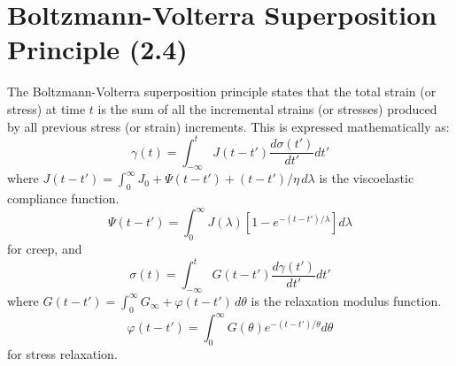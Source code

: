\section{Boltzmann-Volterra Superposition Principle (2.4)}
The Boltzmann-Volterra superposition principle states that the total strain (or stress) at time $t$ is the sum of all the incremental strains (or stresses) produced by all previous stress (or strain) increments.
This is expressed mathematically as:
\begin{equation}
	\gamma(t) = \int_{-\infty}^t J(t - t') \frac{d\sigma(t')}{dt'} dt'
\end{equation}
where $J(t - t') = \int_0^\infty J_0 + \Psi(t - t') + (t - t')/\eta \, d\lambda$ is the viscoelastic compliance function.
\begin{equation}
	\Psi(t - t') = \int_0^\infty J(\lambda) \left[1 - e^{-(t - t')/\lambda}\right] d\lambda
\end{equation}
for creep, and
\begin{equation}
	\sigma(t) = \int_{-\infty}^t G(t - t') \frac{d\gamma(t')}{dt'} dt'
\end{equation}
where $G(t - t') = \int_0^\infty G_\infty + \varphi(t - t') \, d\theta$ is the relaxation modulus function.
\begin{equation}
	\varphi(t - t') = \int_0^\infty G(\theta) e^{-(t - t')/\theta} d\theta
\end{equation}
for stress relaxation.


